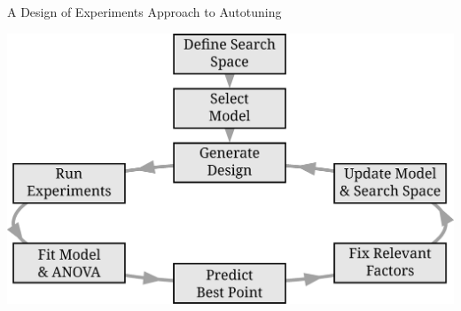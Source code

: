 \documentclass[10pt, compress, aspectratio=169, xcolor={table,usenames,dvipsnames}]{beamer}
\begin{document}
\begin{frame}[label={sec:org85bcacc}]{A Design of Experiments Approach to Autotuning}
\begin{center}
\begin{center}
\includegraphics[width=.72\linewidth]{../img/doe_anova_strategy.eps}
\end{center}

\vspace{-.2cm}
\end{center}
\end{frame}
\end{document}
